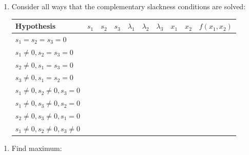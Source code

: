 \documentclass[]{book}
\providecommand{\tightlist}{%
  \setlength{\itemsep}{0pt}\setlength{\parskip}{0pt}}
\theoremstyle{definition}
\theoremstyle{definition}
\theoremstyle{definition}
\theoremstyle{remark}
\begin{document}
\begin{enumerate}
\def\labelenumi{\arabic{enumi}.}
\setcounter{enumi}{3}
\tightlist
\item
  Consider all ways that the complementary slackness conditions are solved:

  \begin{center}
  \begin{tabular}{|l|cccccccc|c|}
  \hline
  Hypothesis & $s_1$ & $s_2$ & $s_3$ & $\lambda_1$ & $\lambda_2$ & $\lambda_3$ & $x_1$ & $x_2$ & $f(x_1, x_2)$\\
  \hline
  $s_1 = s_2 = s_3 = 0$ & \multicolumn{8}{l|}{\phantom{No solution}} & \\
  $s_1 \neq 0, s_2 = s_3 = 0$ & \phantom{2} & \phantom{0} & \phantom{0} & \phantom{0} & \phantom{0} & \phantom{0} & \phantom{0} & \phantom{0} & \phantom{0}\\
  $s_2 \neq 0, s_1 = s_3 = 0$ & \phantom{0} & \phantom{2} & \phantom{0} & \phantom{-8} & \phantom{0} & \phantom{-8} & \phantom{4} & \phantom{0} & \phantom{-16}\\
  $s_3 \neq 0, s_1 = s_2 = 0$ & \phantom{0} & \phantom{0} & \phantom{2} & \phantom{-16} & \phantom{-16} & \phantom{0} & \phantom{0} & \phantom{4} & \phantom{-32}\\
  $s_1 \neq 0, s_2 \neq 0, s_3 = 0$ &\multicolumn{8}{l|}{\phantom{No solution}} & \\
  $s_1 \neq 0, s_3 \neq 0, s_2 = 0$ &\multicolumn{8}{l|}{\phantom{No solution}} & \\
  $s_2 \neq 0, s_3 \neq 0, s_1 = 0$ &\phantom{0} & \phantom{$\sqrt{\frac{8}{3}}$} & \phantom{$\sqrt{\frac{4}{3}}$} & \phantom{$-\frac{16}{3}$} & \phantom{0} & \phantom{0} & \phantom{$\frac{8}{3}$}& \phantom{$\frac{4}{3}$} & \phantom{$-\frac{32}{3}$}\\
  $s_1 \neq 0, s_2 \neq 0, s_3 \neq 0$ &\multicolumn{8}{l|}{\phantom{No solution}}& \\
  \hline
  \end{tabular}
  \end{center}
\end{enumerate}


\begin{enumerate}
\def\labelenumi{\arabic{enumi}.}
\setcounter{enumi}{4}
\tightlist
\item
  Find maximum: \phantom{Looking at the values of $f(x_1,x_2)$ at the critical points, we see that the constrained maximum is located at $(x_1, x_2) = (0,0)$, which is the same as the unconstrained max.  The constrained minimum is located at $(x_1, x_2) = (0,4)$, while there is no unconstrained minimum for this problem.}
\end{enumerate}
\end{document}
